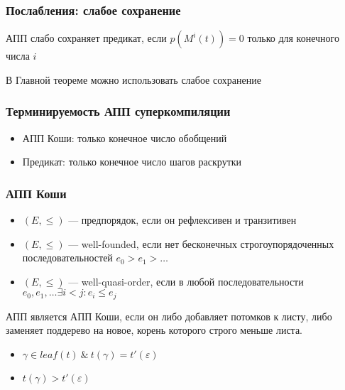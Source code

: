 \documentclass{beamer}
\begin{document}
\begin{frame}[fragile]
  \transwipe[direction=90]
  \frametitle{Послабления: слабое сохранение}

  АПП слабо сохраняет предикат, если $p(M^i(t)) = 0$ только для конечного числа $i$

\vfill

  В Главной теореме можно использовать слабое сохранение
\end{frame} 


\begin{frame}[fragile]
  \transwipe[direction=90]
  \frametitle{Терминируемость АПП суперкомпиляции}

\begin{itemize}
  \item АПП Коши: только конечное число обобщений
  \item Предикат: только конечное число шагов раскрутки
\end{itemize}
\end{frame} 


\begin{frame}[fragile]
  \transwipe[direction=90]
  \frametitle{ АПП Коши  }

  \begin{itemize}
    \item $(E, \leq)$ --- предпорядок, если он рефлексивен и транзитивен
    \item $(E, \leq)$ --- well-founded, если нет бесконечных строгоупорядоченных последовательностей $e_0 > e_1 > \dots$
    \item $(E, \leq)$ --- well-quasi-order, если в любой последовательности $e_0, e_1, \dots \exists i < j: e_i \leq e_j$ 

  \end{itemize} 

  \vfill 

  АПП является АПП Коши, если он либо добавляет потомков к листу, либо заменяет поддерево на новое, корень которого строго меньше листа. 

  \begin{itemize}
    \item $\gamma \in leaf(t) \ \& \ t(\gamma) = t'(\varepsilon)$
    \item $t(\gamma) > t'(\varepsilon)$
  \end{itemize}
\end{frame} 
\end{document}
